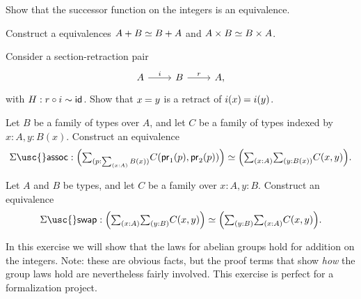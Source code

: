 \begin{exercises}
\begin{subexenum}
  \end{subexenum}
\item \label{ex:succ_equiv} Show that the successor function on the integers is an equivalence.
\item \label{ex:comm_prod}Construct a equivalences $\eqv{A+B}{B+A}$ and $\eqv{A\times B}{B\times A}$.
\item \label{ex:retr_id} Consider a section-retraction pair
  \begin{equation*}
    \begin{tikzcd}
      A \arrow[r,"i"] & B \arrow[r,"r"] & A,
    \end{tikzcd}
  \end{equation*}
  with $H:r\circ i\sim \mathsf{id}_{}$. Show that $\id{x}{y}$ is a retract of $\id{i(x)}{i(y)}$.
\item \label{ex:sigma_assoc}Let $B$ be a family of types over $A$, and let $C$ be a family of types indexed by $x:A,y:B(x)$. Construct an equivalence
  \begin{equation*}
    \Sigma\mathsf{\usc{}assoc}:\eqv{\Big(\sm{p:\sm{x:A}B(x)}C(\proj 1(p),\proj 2(p))\Big)}{\Big(\sm{x:A}\sm{y:B(x)}C(x,y)\Big)}.
  \end{equation*}
\item \label{ex:sigma_swap}Let $A$ and $B$ be types, and let $C$ be a family over $x:A,y:B$. Construct an equivalence
  \begin{equation*}
    \Sigma\mathsf{\usc{}swap}:\eqv{\Big(\sm{x:A}{y:B}C(x,y)\Big)}{\Big(\sm{y:B}{x:A}C(x,y)\Big)}.
  \end{equation*}
\item \label{ex:int_group_laws} In this exercise we will show that the laws for abelian groups hold for addition on the integers. Note: these are obvious facts, but the proof terms that show \emph{how} the group laws hold are nevertheless fairly involved. This exercise is perfect for a formalization project. 
  \begin{subexenum}

\end{subexenum}
\end{exercises}
